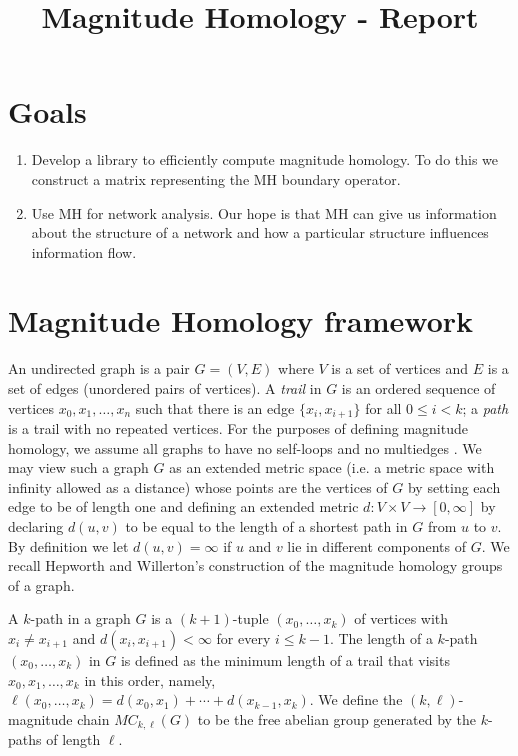 \documentclass{article}
\title{Magnitude Homology - Report}
\begin{document}
	
	\maketitle
	
	\section{Goals}
	\begin{enumerate}
		\item Develop a library to efficiently compute magnitude homology. To do this we construct a matrix representing the MH boundary operator.
		\item Use MH for network analysis. Our hope is that MH can give us information about the structure of a network and how a particular structure influences information flow.
	\end{enumerate}
	
	\section{Magnitude Homology framework}
	An undirected graph is a pair $G=(V,E)$ where $V$ is a set of vertices and $E$ is a set of edges (unordered pairs of vertices). A \emph{trail} in $G$ is an ordered sequence of vertices $x_0,x_1,\ldots,x_n$ such that there is an edge $\{x_i,x_{i+1}\}$ for all $0\leq i<k$; a \emph{path} is a trail with no repeated vertices.
	For the purposes of defining magnitude homology, we assume all graphs to have no self-loops and no multiedges \cite{leinster2019magnitude}.
	We may view such a graph $G$ as an extended metric space (i.e. a metric space with infinity allowed as a distance) whose points are the vertices of $G$ by setting each edge to be of length one and defining an extended metric $d:V \times V \to [0,\infty]$ by declaring $d(u,v)$ to be equal to the length of a shortest path in $G$ from $u$ to $v$.
	By definition we let $d(u,v) = \infty$ if $u$ and $v$ lie in different components of $G$.
	We recall Hepworth and Willerton's construction \cite{hepworth2015categorifying} of the magnitude homology groups of a graph.
	
	A $k$-path in a graph $G$ is a $(k+1)$-tuple $(x_0,\dots,x_k)$ of vertices  with $x_i \neq x_{i+1}$ and $d(x_i,x_{i+1})<\infty$ for every $i \leq k-1$.
	The length of a $k$-path $(x_0,\dots,x_k)$ in $G$ is defined as the minimum length of a trail that visits $x_0,x_1,\ldots,x_k$ in this order, namely, 
	\(
	\ell (x_0,\dots,x_k) = d(x_0,x_1)+\cdots + d(x_{k-1},x_k).
	\)
	We define the $(k,\ell)$-magnitude chain $MC_{k,\ell}(G)$ to be the free abelian group generated by the $k$-paths of length $\ell$.
	
\end{document}

